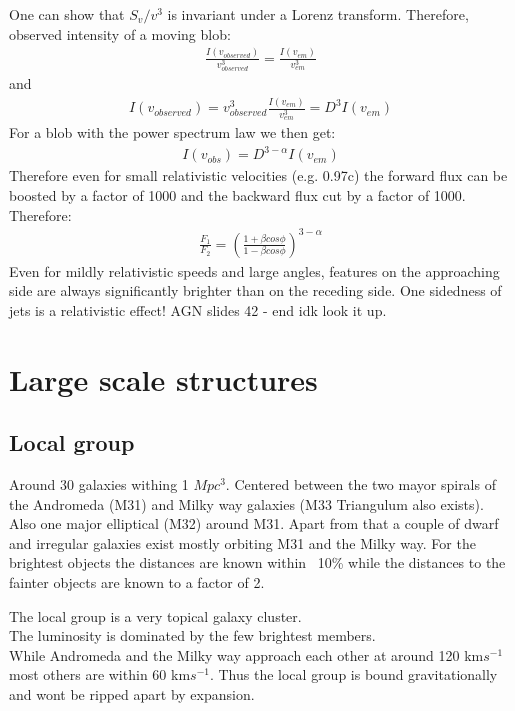 \documentclass[11pt,a4paper]{article}
\begin{document}
One can show that $S_v / v^3$ is invariant under a Lorenz transform.
Therefore, observed intensity of a moving blob: 
\begin{align*}
    \frac {I (v_{observed})} {v^3_{observed}} = \frac {I (v_{em})} {v^3_{em}}
\end{align*}
and 
\begin{align*}
    I (v_{observed}) = v^3_{observed} \frac {I(v_{em})} {v_{em}^3} = D^3 I (v_{em})
\end{align*}
For a blob with the power spectrum law we then get:
\begin{align*}
    I(v_{obs}) = D^{3-\alpha} I(v_{em})
\end{align*}
Therefore even for small relativistic velocities (e.g. 0.97c) the forward flux can be boosted by a factor of 1000 and the backward flux cut by a factor of 1000.
Therefore: 
\begin{align*}
    \frac {F_1}{F_2} = (\frac {1+\beta cos \phi}{1-\beta cos \phi})^{3-\alpha}
\end{align*}
Even for mildly relativistic speeds and large
angles, features on the approaching side are
always significantly brighter than on the receding side.
One sidedness of jets is a relativistic effect!
AGN slides 42 - end idk look it up.
\section{Large scale structures}
\subsection{Local group}
Around 30 galaxies withing 1 $Mpc^3$.
Centered between the two mayor spirals of the Andromeda (M31) and Milky way galaxies (M33 Triangulum also exists).
Also one major elliptical (M32) around M31.
Apart from that a couple of dwarf and irregular galaxies exist mostly orbiting M31 and the Milky way.
For the brightest objects the distances are known within ~10\% while the distances to the fainter objects are known to a factor of 2. 

The local group is a very topical galaxy cluster. \\ 
The luminosity is dominated by the few brightest members. \\ 
While Andromeda and the Milky way approach each other at around 120 km$s^{-1}$ most others are within 60 km$s^{-1}$. 
Thus the local group is bound gravitationally and wont be ripped apart by expansion.
\end{document}
